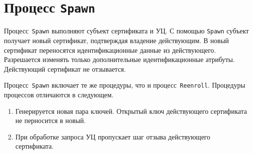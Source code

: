 \section{Процесс \texttt{Spawn}}\label{PROCESSES.Spawn}

Процесс~\texttt{Spawn} выполняют субъект сертификата и УЦ. 
С помощью \texttt{Spawn} субъект получает новый сертификат,
подтверждая владение действующим. В новый сертификат переносятся   
идентификационные данные из действующего. Разрешается изменять 
только дополнительные идентификационные атрибуты. Действующий 
сертификат не отзывается.

Процесс~\texttt{Spawn} включает те же процедуры, что и
процесс~\texttt{Reenroll}. Процедуры процессов отличаются в следующем.

\begin{enumerate}
\item
Генерируется новая пара ключей. Открытый ключ действующего сертификата
не перносится в новый.
\item
При обработке запроса УЦ пропускает шаг отзыва действующего сертификата. 
\end{enumerate}



